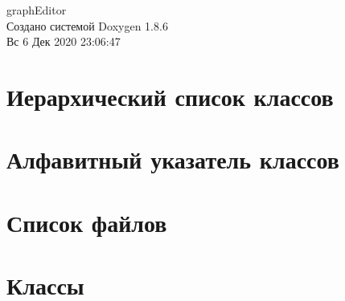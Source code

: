 \documentclass[twoside]{book}
\newcommand{\clearemptydoublepage}{%
  \newpage{\pagestyle{empty}\cleardoublepage}%
}
\begin{document}
\hypersetup{pageanchor=false}
\begin{titlepage}
\vspace*{7cm}
\begin{center}%
{\Large graph\-Editor }\\
\vspace*{1cm}
{\large Создано системой Doxygen 1.8.6}\\
\vspace*{0.5cm}
{\small Вс 6 Дек 2020 23:06:47}\\
\end{center}
\end{titlepage}
\clearemptydoublepage
\tableofcontents
\clearemptydoublepage
{}
\hypersetup{pageanchor=true}

\chapter{Иерархический список классов}

\chapter{Алфавитный указатель классов}

\chapter{Список файлов}

\chapter{Классы}



































\end{document}
